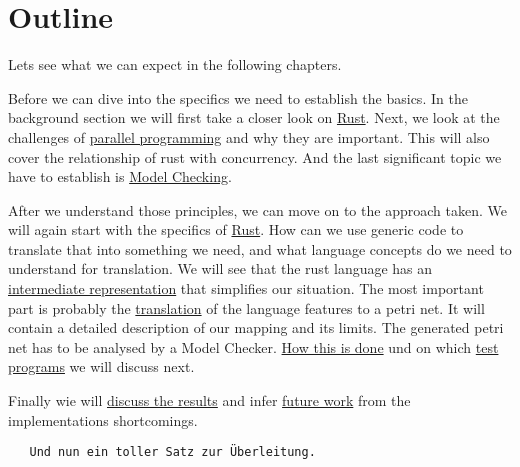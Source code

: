 \section{Outline}
Lets see what we can expect in the following chapters.

Before we can dive into the specifics we need to establish the basics.
In the background section we will first take a closer look on \hyperlink{rel_rust}{Rust}.
Next, we look at the challenges of \hyperlink{rel_para}{parallel programming} and why they are important.
This will also cover the relationship of rust with concurrency.
And the last significant topic we have to establish is \hyperlink{rel_mc}{Model Checking}.

After we understand those principles, we can move on to the approach taken.
We will again start with the specifics of \hyperlink{app_rust}{Rust}.
How can we use generic code to translate that into something we need,
and what language concepts do we need to understand for translation.
We will see that the rust language has an \hyperlink{app_mir}{intermediate representation} that simplifies our situation.
The most important part is probably the \hyperlink{app_trans}{translation} of the language features to a petri net.
It will contain a detailed description of our mapping and its limits.
The generated petri net has to be analysed by a Model Checker. 
\hyperlink{app_mc}{How this is done} und on which \hyperlink{app_test}{test programs} we will discuss next.

Finally wie will \hyperlink{results}{discuss the results} and infer \hyperlink{future}{future work} from the implementations shortcomings.
\begin{verbatim}
   Und nun ein toller Satz zur Überleitung.
\end{verbatim}